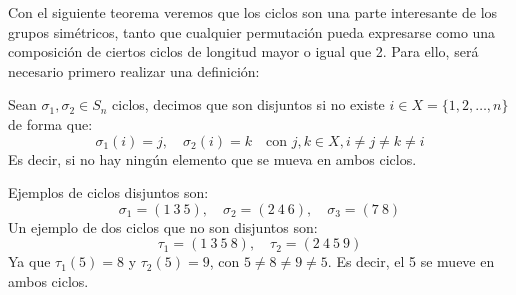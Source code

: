 Con el siguiente teorema veremos que los ciclos son una parte interesante de los grupos simétricos, tanto que cualquier permutación pueda expresarse como una composición de ciertos ciclos de longitud mayor o igual que 2. Para ello, será necesario primero realizar una definición:

\begin{definicion}
    Sean $\sigma_1,\sigma_2\in S_n$ ciclos, decimos que son disjuntos si no existe $i \in X=\{1,2,\ldots,n\}$ de forma que:
    \begin{equation*}
        \sigma_1(i) = j, \quad \sigma_2(i) = k \quad \text{con\ } j,k \in X, i\neq j \neq k \neq i
    \end{equation*}
    Es decir, si no hay ningún elemento que se mueva en ambos ciclos.
\end{definicion}

\begin{ejemplo}
    Ejemplos de ciclos disjuntos son:
    \begin{equation*}
        \sigma_1 = (1\ 3\ 5), \quad \sigma_2 = (2\ 4\ 6), \quad \sigma_3 = (7\ 8)
    \end{equation*}
    Un ejemplo de dos ciclos que no son disjuntos son:
    \begin{equation*}
        \tau_1 = (1\ 3\ 5\ 8), \quad \tau_2 = (2\ 4\ 5\ 9)
    \end{equation*}
    Ya que $\tau_1(5) = 8$ y $\tau_2(5) = 9$, con $5\neq 8 \neq 9 \neq 5$. Es decir, el 5 se mueve en ambos ciclos.
\end{ejemplo}

